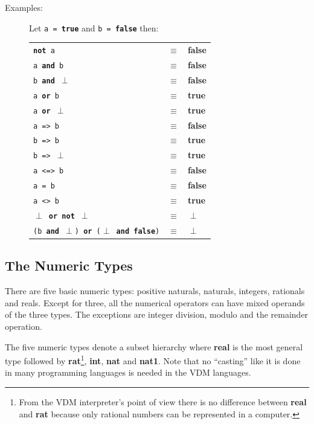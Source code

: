 \documentclass{overturerepchap}
\newcommand{\Index}[1]{#1\index{#1}}
\newcommand{\keyw}[1]{{\bf\ttfamily #1}}
\begin{document}
\begin{description}
\item[Examples:] 
  Let {\tt a = \keyw{true}} and {\tt b = \keyw{false}} then:
  
  \begin{tabular}{lcl}
    {\tt \keyw{not} a} & $\equiv$ & \keyw{false} \\
    {\tt a \keyw{and} b} & $\equiv$ & \keyw{false} \\
    {\tt b \keyw{and} $\perp$} & $\equiv$ & \keyw{false} \\
    {\tt a \keyw{or} b} & $\equiv$ & \keyw{true} \\
    {\tt a \keyw{or} $\perp$} & $\equiv$ & \keyw{true} \\
    {\tt a => b} & $\equiv$ & \keyw{false} \\
    {\tt b => b} & $\equiv$ & \keyw{true} \\
    {\tt b => $\perp$} & $\equiv$ & \keyw{true} \\
    {\tt a <=> b} & $\equiv$ & \keyw{false} \\
    {\tt a = b} & $\equiv$ & \keyw{false} \\
    {\tt a <> b} & $\equiv$ & \keyw{true} \\
    {\tt $\perp$ \keyw{or} \keyw{not} $\perp$} & $\equiv$ & $\perp$\\
    {\tt (b \keyw{and} $\perp$) \keyw{or} ($\perp$ \keyw{and}
    \keyw{false})} & $\equiv$ & $\perp$
  \end{tabular}
\end{description}

\subsection{The Numeric Types}\label{numeric}

There are five basic numeric types: positive naturals, naturals,
integers, rationals and reals.  Except for three, all the
numerical operators can have mixed operands of the three types. The
exceptions are integer division, modulo and the remainder operation.

The five numeric types denote a subset hierarchy where \Index{\keyw{real}} is
the most general type followed by \Index{\keyw{rat}}\footnote{From the
VDM interpreter's point of view there is no
  difference between \keyw{real} and \keyw{rat} because only rational
  numbers can be represented in a computer.}, \Index{\keyw{int}},
\Index{\keyw{nat}} and \Index{\keyw{nat1}}. Note that no ``casting''
like it is done in many programming languages is needed in the VDM
languages. 
\end{document}
